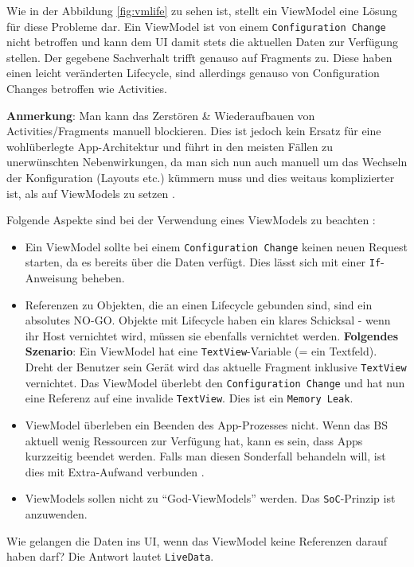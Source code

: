 Wie in der Abbildung \ref{fig:vmlife} zu sehen ist, stellt ein ViewModel
eine Lösung für diese Probleme dar. Ein ViewModel ist von einem
\texttt{Configuration\ Change} nicht betroffen und kann dem UI damit
stets die aktuellen Daten zur Verfügung stellen. Der gegebene
Sachverhalt trifft genauso auf Fragments zu. Diese haben einen leicht
veränderten Lifecycle, sind allerdings genauso von Configuration Changes
betroffen wie Activities.

\textbf{Anmerkung}: Man kann das Zerstören \& Wiederaufbauen von
Activities/Fragments manuell blockieren. Dies ist jedoch kein Ersatz für
eine wohlüberlegte App-Architektur und führt in den meisten Fällen zu
unerwünschten Nebenwirkungen, da man sich nun auch manuell um das
Wechseln der Konfiguration (Layouts etc.) kümmern muss und dies weitaus
komplizierter ist, als auf ViewModels zu setzen
\cite{lifecycle-blocking}.

Folgende Aspekte sind bei der Verwendung eines ViewModels zu beachten
\cite{viewmodel-antipatterns}:

\begin{itemize}
\tightlist
\item
  Ein ViewModel sollte bei einem \texttt{Configuration\ Change} keinen
  neuen Request starten, da es bereits über die Daten verfügt. Dies
  lässt sich mit einer \texttt{If}-Anweisung beheben.
\item
  Referenzen zu Objekten, die an einen Lifecycle gebunden sind, sind ein
  absolutes NO-GO. Objekte mit Lifecycle haben ein klares Schicksal -
  wenn ihr Host vernichtet wird, müssen sie ebenfalls vernichtet werden.
  \textbf{Folgendes Szenario}: Ein ViewModel hat eine
  \texttt{TextView}-Variable (= ein Textfeld). Dreht der Benutzer sein
  Gerät wird das aktuelle Fragment inklusive \texttt{TextView}
  vernichtet. Das ViewModel überlebt den \texttt{Configuration\ Change}
  und hat nun eine Referenz auf eine invalide \texttt{TextView}. Dies
  ist ein \texttt{Memory\ Leak}.
\item
  ViewModel überleben ein Beenden des App-Prozesses nicht. Wenn das BS
  aktuell wenig Ressourcen zur Verfügung hat, kann es sein, dass Apps
  kurzzeitig beendet werden. Falls man diesen Sonderfall behandeln will,
  ist dies mit Extra-Aufwand verbunden \cite{viewmodel-process-death}.
\item
  ViewModels sollen nicht zu ``God-ViewModels'' werden. Das
  \texttt{SoC}-Prinzip ist anzuwenden.
\end{itemize}

Wie gelangen die Daten ins UI, wenn das ViewModel keine Referenzen
darauf haben darf? Die Antwort lautet \texttt{LiveData}.

